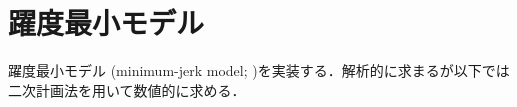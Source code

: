 \section{躍度最小モデル}躍度最小モデル (minimum-jerk model; \cite{Flash1985-vj})を実装する．解析的に求まるが以下では二次計画法を用いて数値的に求める．